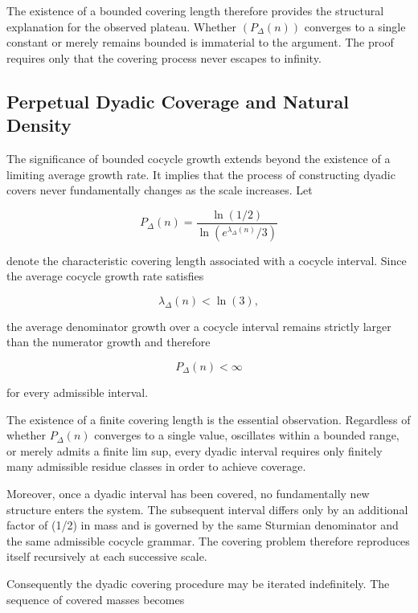 \documentclass[12pt, oneside]{article}
\numberwithin{equation}{section}
\theoremstyle{definition}
\theoremstyle{plain}
\theoremstyle{remark}
\begin{document}
The existence of a bounded covering length therefore provides the structural
explanation for the observed plateau. Whether $(P_{\Delta}(n))$ converges to a
single constant or merely remains bounded is immaterial to the argument. The
proof requires only that the covering process never escapes to infinity.

\subsection{Perpetual Dyadic Coverage and Natural Density}
\label{subsec:perpetual-dyadic-coverage}

The significance of bounded cocycle growth extends beyond the existence of a
limiting average growth rate. It implies that the process of constructing dyadic
covers never fundamentally changes as the scale increases.  Let

\[
P_\Delta(n) = \frac{\ln(1/2)}
{\ln\left(e^{\lambda_\Delta(n)}/3\right)}
\]

denote the characteristic covering length associated with a cocycle interval.
Since the average cocycle growth rate satisfies

\[
\lambda_\Delta(n) < \ln(3),
\]

the average denominator growth over a cocycle interval remains strictly larger
than the numerator growth and therefore

\[
P_\Delta(n) < \infty
\]

for every admissible interval.

The existence of a finite covering length is the essential observation. Regardless
of whether \(P_\Delta(n)\) converges to a single value, oscillates within a bounded
range, or merely admits a finite lim sup, every dyadic interval requires only
finitely many admissible residue classes in order to achieve coverage.

Moreover, once a dyadic interval has been covered, no fundamentally new structure
enters the system. The subsequent interval differs only by an additional factor
of (1/2) in mass and is governed by the same Sturmian denominator and the same
admissible cocycle grammar. The covering problem therefore reproduces itself
recursively at each successive scale.

Consequently the dyadic covering procedure may be iterated indefinitely. The sequence
of covered masses becomes
\end{document}
